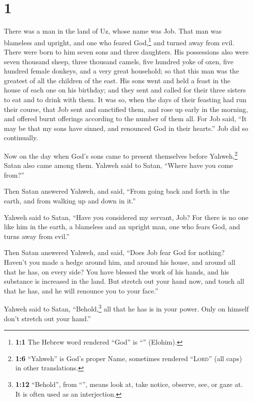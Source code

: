 \hypertarget{section}{%
\section{1}\label{section}}

 There was a man in the land of Uz, whose name was Job.
That man was blameless and upright, and one who feared God,\footnote{\textbf{1:1}
  The Hebrew word rendered ``God'' is ``'' (Elohim).} and
turned away from evil.  There were born to him seven sons
and three daughters.  His possessions also were seven
thousand sheep, three thousand camels, five hundred yoke of oxen, five
hundred female donkeys, and a very great household; so that this man was
the greatest of all the children of the east.  His sons
went and held a feast in the house of each one on his birthday; and they
sent and called for their three sisters to eat and to drink with them.
 It was so, when the days of their feasting had run their
course, that Job sent and sanctified them, and rose up early in the
morning, and offered burnt offerings according to the number of them
all. For Job said, ``It may be that my sons have sinned, and renounced
God in their hearts.'' Job did so continually.

 Now on the day when God's sons came to present themselves
before Yahweh,\footnote{\textbf{1:6} ``Yahweh'' is God's proper Name,
  sometimes rendered ``\textsc{Lord}'' (all caps) in other translations.}
Satan also came among them.  Yahweh said to Satan, ``Where
have you come from?''

Then Satan answered Yahweh, and said, ``From going back and forth in the
earth, and from walking up and down in it.''

 Yahweh said to Satan, ``Have you considered my servant,
Job? For there is no one like him in the earth, a blameless and an
upright man, one who fears God, and turns away from evil.''

 Then Satan answered Yahweh, and said, ``Does Job fear God
for nothing?  Haven't you made a hedge around him, and
around his house, and around all that he has, on every side? You have
blessed the work of his hands, and his substance is increased in the
land.  But stretch out your hand now, and touch all that
he has, and he will renounce you to your face.''

 Yahweh said to Satan, ``Behold,\footnote{\textbf{1:12}
  ``Behold'', from ``'', means look at, take notice,
  observe, see, or gaze at. It is often used as an interjection.} all
that he has is in your power. Only on himself don't stretch out your
hand.''

